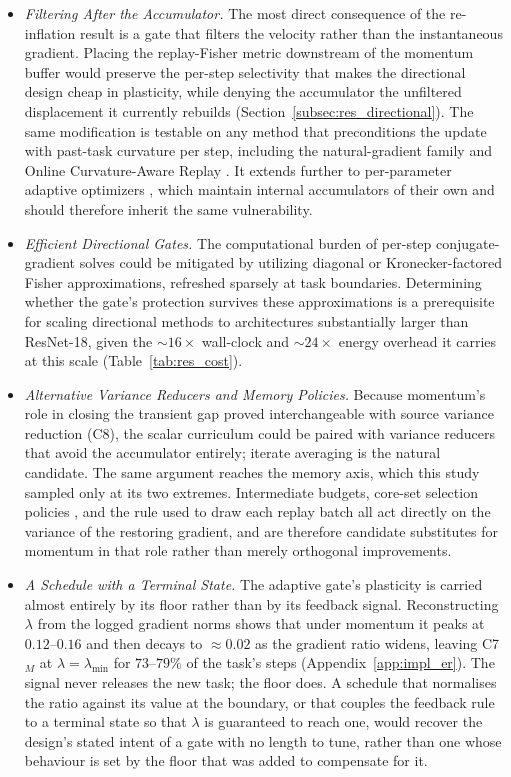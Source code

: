\begin{itemize}
    \item \emph{Filtering After the Accumulator.} The most direct consequence of the re-inflation result is a gate that filters the velocity rather than the instantaneous gradient. Placing the replay-Fisher metric downstream of the momentum buffer would preserve the per-step selectivity that makes the directional design cheap in plasticity, while denying the accumulator the unfiltered displacement it currently rebuilds (Section~\ref{subsec:res_directional}). The same modification is testable on any method that preconditions the update with past-task curvature per step, including the natural-gradient family \citep{kao2021naturalcontinuallearningsuccess} and Online Curvature-Aware Replay \citep{urettini2025onlinecurvatureawarereplay}. It extends further to per-parameter adaptive optimizers \citep{obis2025optimizersstabilitygap}, which maintain internal accumulators of their own and should therefore inherit the same vulnerability.
    \item \emph{Efficient Directional Gates.} The computational burden of per-step conjugate-gradient solves could be mitigated by utilizing diagonal or Kronecker-factored Fisher approximations, refreshed sparsely at task boundaries. Determining whether the gate's protection survives these approximations is a prerequisite for scaling directional methods to architectures substantially larger than ResNet-18, given the ${\sim}16\times$ wall-clock and ${\sim}24\times$ energy overhead it carries at this scale (Table~\ref{tab:res_cost}).
    \item \emph{Alternative Variance Reducers and Memory Policies.} Because momentum's role in closing the transient gap proved interchangeable with source variance reduction (C8), the scalar curriculum could be paired with variance reducers that avoid the accumulator entirely; iterate averaging is the natural candidate. The same argument reaches the memory axis, which this study sampled only at its two extremes. Intermediate budgets, core-set selection policies \citep{aljundi2019gradientbasedsampleselection, bang2021rainbowmemorycontinuallearning}, and the rule used to draw each replay batch all act directly on the variance of the restoring gradient, and are therefore candidate substitutes for momentum in that role rather than merely orthogonal improvements.
    \item \emph{A Schedule with a Terminal State.} The adaptive gate's plasticity is carried almost entirely by its floor rather than by its feedback signal. Reconstructing $\lambda$ from the logged gradient norms shows that under momentum it peaks at $0.12$--$0.16$ and then decays to ${\approx}0.02$ as the gradient ratio widens, leaving C7$_M$ at $\lambda = \lambda_{\min}$ for $73$--$79\%$ of the task's steps (Appendix~\ref{app:impl_er}). The signal never releases the new task; the floor does. A schedule that normalises the ratio against its value at the boundary, or that couples the feedback rule to a terminal state so that $\lambda$ is guaranteed to reach one, would recover the design's stated intent of a gate with no length to tune, rather than one whose behaviour is set by the floor that was added to compensate for it.
\end{itemize}


